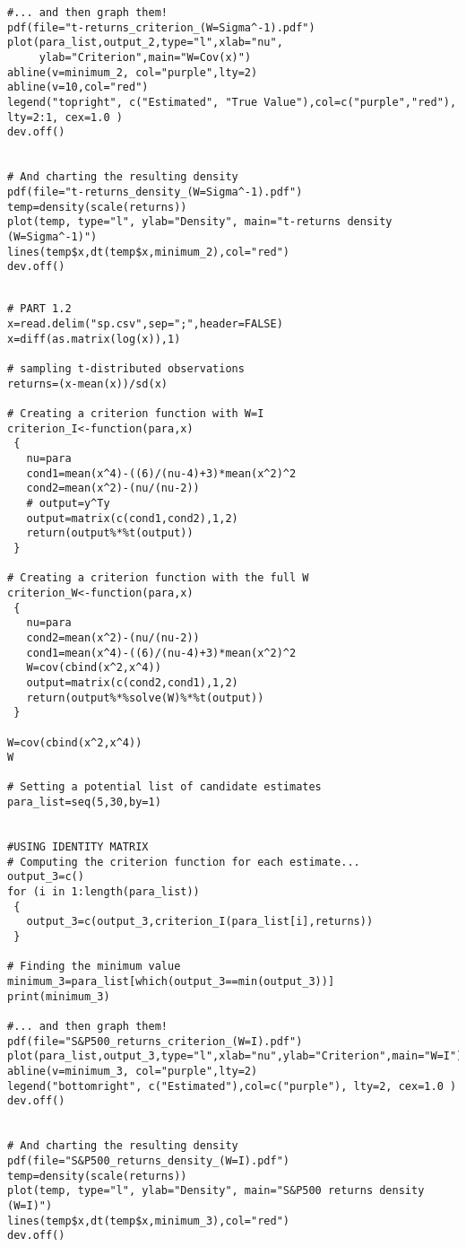 \begin{appendices}
\begin{verbatim}
#... and then graph them!
pdf(file="t-returns_criterion_(W=Sigma^-1).pdf")
plot(para_list,output_2,type="l",xlab="nu",
     ylab="Criterion",main="W=Cov(x)")
abline(v=minimum_2, col="purple",lty=2)
abline(v=10,col="red")
legend("topright", c("Estimated", "True Value"),col=c("purple","red"), lty=2:1, cex=1.0 )
dev.off()


# And charting the resulting density
pdf(file="t-returns_density_(W=Sigma^-1).pdf")
temp=density(scale(returns))
plot(temp, type="l", ylab="Density", main="t-returns density (W=Sigma^-1)")
lines(temp$x,dt(temp$x,minimum_2),col="red")
dev.off()


\end{verbatim}

\newpage
\begin{verbatim}
# PART 1.2
x=read.delim("sp.csv",sep=";",header=FALSE)
x=diff(as.matrix(log(x)),1)

# sampling t-distributed observations
returns=(x-mean(x))/sd(x)
       
# Creating a criterion function with W=I
criterion_I<-function(para,x)
 {
   nu=para
   cond1=mean(x^4)-((6)/(nu-4)+3)*mean(x^2)^2
   cond2=mean(x^2)-(nu/(nu-2))
   # output=y^Ty
   output=matrix(c(cond1,cond2),1,2)
   return(output%*%t(output))
 }
       
# Creating a criterion function with the full W
criterion_W<-function(para,x)
 {
   nu=para
   cond2=mean(x^2)-(nu/(nu-2))
   cond1=mean(x^4)-((6)/(nu-4)+3)*mean(x^2)^2
   W=cov(cbind(x^2,x^4))
   output=matrix(c(cond2,cond1),1,2)
   return(output%*%solve(W)%*%t(output))
 }

W=cov(cbind(x^2,x^4))
W
       
# Setting a potential list of candidate estimates
para_list=seq(5,30,by=1)


#USING IDENTITY MATRIX
# Computing the criterion function for each estimate...
output_3=c()
for (i in 1:length(para_list))
 {
   output_3=c(output_3,criterion_I(para_list[i],returns))
 }
       
# Finding the minimum value
minimum_3=para_list[which(output_3==min(output_3))]
print(minimum_3)

#... and then graph them!
pdf(file="S&P500_returns_criterion_(W=I).pdf")
plot(para_list,output_3,type="l",xlab="nu",ylab="Criterion",main="W=I")
abline(v=minimum_3, col="purple",lty=2)
legend("bottomright", c("Estimated"),col=c("purple"), lty=2, cex=1.0 )
dev.off()

       
# And charting the resulting density
pdf(file="S&P500_returns_density_(W=I).pdf")
temp=density(scale(returns))
plot(temp, type="l", ylab="Density", main="S&P500 returns density (W=I)")
lines(temp$x,dt(temp$x,minimum_3),col="red")       
dev.off()



\end{verbatim}
\end{appendices}
